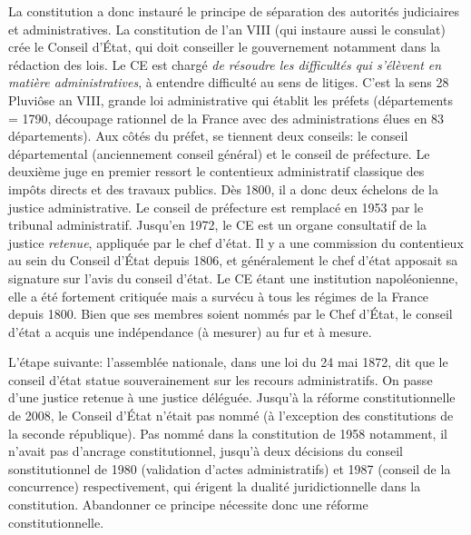 \documentclass[math]{cours}
\begin{document}
La constitution a donc instauré le principe de séparation des autorités judiciaires et administratives.
La constitution de l'an VIII (qui instaure aussi le consulat) crée le Conseil d'État, qui doit conseiller le gouvernement notamment dans la rédaction des lois.
Le CE est chargé \textit{de résoudre les difficultés qui s'élèvent en matière administratives}, à entendre difficulté au sens de litiges.
C'est la sens
28 Pluviôse an VIII, grande loi administrative qui établit les préfets (départements = 1790, découpage rationnel de la France avec des administrations élues en 83 départements).
Aux côtés du préfet, se tiennent deux conseils: le conseil départemental (anciennement conseil général) et le conseil de préfecture.
Le deuxième juge en premier ressort le contentieux administratif classique des impôts directs et des travaux publics.
Dès 1800, il a donc deux échelons de la justice administrative.
Le conseil de préfecture est remplacé en 1953 par le tribunal administratif.
Jusqu'en 1972, le CE est un organe consultatif de la justice \emph{retenue}, appliquée par le chef d'état.
Il y a une commission du contentieux au sein du Conseil d'État depuis 1806, et généralement le chef d'état apposait sa signature sur l'avis du conseil d'état.
Le CE étant une institution napoléonienne, elle a été fortement critiquée mais a survécu à tous les régimes de la France depuis 1800.
Bien que ses membres soient nommés par le Chef d'État, le conseil d'état a acquis une indépendance (à mesurer) au fur et à mesure.

L'étape suivante: l'assemblée nationale, dans une loi du 24 mai 1872, dit que le conseil d'état statue souverainement sur les recours administratifs.
On passe d'une justice retenue à une justice déléguée.
Jusqu'à la réforme constitutionnelle de 2008, le Conseil d'État n'était pas nommé (à l'exception des constitutions de la seconde république).
Pas nommé dans la constitution de 1958 notamment, il n'avait pas d'ancrage constitutionnel, jusqu'à deux décisions du conseil sonstitutionnel de 1980 (validation d'actes administratifs) et 1987 (conseil de la concurrence) respectivement, qui érigent la dualité juridictionnelle dans la constitution.
Abandonner ce principe nécessite donc une réforme constitutionnelle.
\end{document}
